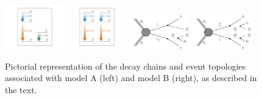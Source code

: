 \begin{figure}[htb]
\includegraphics[width=0.23\textwidth,viewport=250 100 800 700,clip=true]{plots/model1}
\includegraphics[width=0.23\textwidth,viewport=250 100 800 700,clip=true]{plots/model2}
\includegraphics[width=0.23\textwidth]{plots/T21bH.pdf}
\includegraphics[width=0.23\textwidth]{plots/T2bH.pdf}
\caption{\label{fig:simplifiedModels} Pictorial representation of the
  decay chains and event topologies associated with model A (left) and model B (right), as described in the text.}
\end{figure}